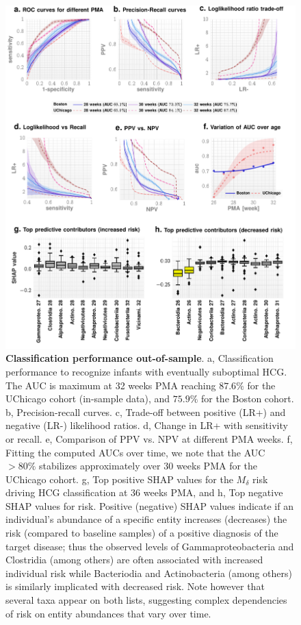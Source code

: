 \documentclass[onecolumn,10pt]{IEEEtran}
\newcommand{\captionN}[1]{\caption{\color{darkgray} \sffamily \fontsize{9}{10}\selectfont #1  }}
\def\erisk{$M_\delta$\xspace}
\begin{document}
\begin{figure}[!ht]
\centering
\includegraphics[width=.99\textwidth]{fig3.pdf}
\captionN{\textbf{Classification performance  out-of-sample}. a, Classification performance to recognize infants with eventually suboptimal HCG. The AUC is maximum at 32 weeks PMA reaching $87.6\%$ for the UChicago cohort (in-sample data), and $75.9\%$ for the Boston cohort. b, Precision-recall curves. c, Trade-off between positive (LR+) and negative (LR-) likelihood ratios. d, Change in LR+ with sensitivity or recall. e, Comparison of PPV vs. NPV at different PMA weeks. f, Fitting the computed AUCs over time, we note that the AUC $>80\%$ stabilizes approximately over 30 weeks PMA for the UChicago cohort. g, Top positive SHAP values for the \erisk risk driving HCG classification at 36 weeks PMA, and h, Top negative SHAP values for risk. Positive (negative) SHAP values indicate if an individual's abundance of a specific entity increases (decreases) the risk (compared to baseline samples) of a positive diagnosis of the target disease; thus the observed levels of Gammaproteobacteria and Clostridia (among others) are often associated with increased individual risk while Bacteriodia and Actinobacteria (among others) is similarly implicated with decreased risk. Note however that several taxa appear on both lists, suggesting complex dependencies of risk on entity abundances that vary over time.}\label{fig:perf}
\end{figure}
\end{document}
